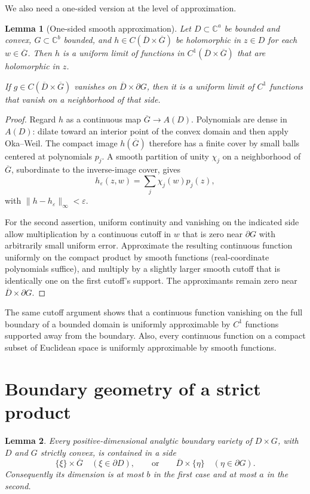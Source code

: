 \documentclass[11pt]{article}
\newtheorem{lemma}{Lemma}
\newcommand{\C}{\mathbb C}
\newcommand{\bd}{\partial}
\newcommand{\cl}[1]{\overline{#1}}
\begin{document}
We also need a one-sided version at the level of approximation.

\begin{lemma}[One-sided smooth approximation]\label{lem:one}
Let $D\subset\C^a$ be bounded and convex, $G\subset\C^b$ bounded, and
$h\in C(\cl D\times\cl G)$ be holomorphic in $z\in D$ for each
$w\in\cl G$.  Then $h$ is a uniform limit of functions in
$C^1(\cl D\times\cl G)$ that are holomorphic in $z$.

If $g\in C(\cl D\times\cl G)$ vanishes on
$\cl D\times\bd G$, then it is a uniform limit of $C^1$ functions that
vanish on a neighborhood of that side.
\end{lemma}

\begin{proof}
Regard $h$ as a continuous map $\cl G\to A(D)$.  Polynomials are dense in
$A(D)$: dilate toward an interior point of the convex domain and then apply
Oka--Weil.  The compact image $h(\cl G)$ therefore has a finite cover by
small balls centered at polynomials $p_j$.  A smooth partition of unity
$\chi_j$ on a neighborhood of $\cl G$, subordinate to the inverse-image
cover, gives
\[
                         h_\varepsilon(z,w)
                  =\sum_j\chi_j(w)p_j(z),
\]
with $\|h-h_\varepsilon\|_\infty<\varepsilon$.

For the second assertion, uniform continuity and vanishing on the indicated
side allow multiplication by a continuous cutoff in $w$ that is zero near
$\bd G$ with arbitrarily small uniform error.  Approximate the resulting
continuous function uniformly on the compact product by smooth functions
(real-coordinate polynomials suffice), and multiply by a slightly larger
smooth cutoff that is identically one on the first cutoff's support.  The
approximants remain zero near $\cl D\times\bd G$.
\end{proof}

The same cutoff argument shows that a continuous function vanishing on the
full boundary of a bounded domain is uniformly approximable by $C^1$
functions supported away from the boundary.  Also, every continuous function
on a compact subset of Euclidean space is uniformly approximable by smooth
functions.

\section{Boundary geometry of a strict product}

\begin{lemma}\label{lem:geometry}
Every positive-dimensional analytic boundary variety of
$D\times G$, with $D$ and $G$ strictly convex, is contained in a side
\[
             \{\xi\}\times\cl G\quad(\xi\in\bd D),
       \qquad\text{or}\qquad
             \cl D\times\{\eta\}\quad(\eta\in\bd G).
\]
Consequently its dimension is at most $b$ in the first case and at most
$a$ in the second.
\end{lemma}
\end{document}

